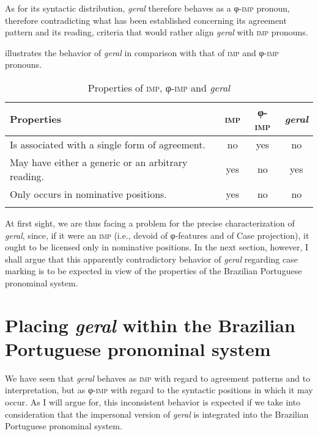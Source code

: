 \documentclass[output=paper]{langscibook}
\begin{document}
{As for its syntactic distribution, \textit{geral} }{therefore behaves as a φ-\textsc{imp} pronoun, therefore contradicting what has been established concerning its agreement pattern and its reading, criteria that would rather align} \textit{geral} {with \textsc{imp} pronouns.}

 illustrates the behavior of \textit{geral} {in comparison with that of \textsc{imp} and φ-\textsc{imp} pronouns.} 

\begin{table}
\begin{tabular}{l ccc}
\lsptoprule
{Properties} & \textsc{imp} & {{φ-\textsc{imp}}} & {{\textit{geral}}}\\
\midrule
Is associated with a single form of agreement. &  no &  yes &  no\\
May have either a generic or an arbitrary reading. &  yes &  no &  yes\\
Only occurs in nominative positions. &  yes &  no & no\\
\lspbottomrule
\end{tabular}
\caption{Properties of \textsc{imp}, φ-\textsc{imp} and \textit{geral}\label{tab:avelar:2}}
\end{table}

At first sight, we are thus facing a problem for the precise characterization of \textit{geral}, since, if it were an \textsc{imp} (i.e., devoid of φ-fea\-tures and of Case projection), it ought to be licensed only in nominative positions. In the next section, however, I shall argue that this apparently contradictory behavior of \textit{geral} regarding case marking is to be expected in view of the properties of the Brazilian Portuguese pronominal system.

\section{Placing \textit{geral} within the Brazilian Portuguese pronominal system}\label{sec:avelar:5}

{We have seen that} \textit{geral} {behaves as \textsc{imp} with regard to agreement patterns and to interpretation, but as φ-\textsc{imp} with regard to the syntactic positions in which it may occur. As I will argue for, this inconsistent behavior is expected if we take into consideration that the impersonal version of} \textit{geral} {is integrated into the Brazilian Portuguese pronominal system.}
\end{document}
